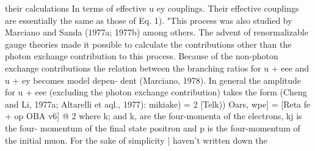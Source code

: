\documentclass[twoside]{article}
\begin{document}
{{{{{{their calculations In terms of effective u ey couplings. Their effective
couplings are essentially the same as those of Eq. 1). "This process was
also studied by Marciano and Sanda (1977a; 1977b) among others. The
advent of renormalizable gauge theories made it possible to calculate
the contributions other than the photon exchange contribution to this
process. Because of the non-photon exchange contributions the relation
between the branching ratios for u + eee and u + ey becomes model depen-
dent (Marciano, 1978). In general the amplitude for u + eee (excluding
the photon exchange contribution) takes the form (Cheng and Li, 1977a;
Altarelli et aql., 1977):
mikiake) = 2 [Telk)) Oars, wpe] =
[Reta fe + op OBA v6] @
2
where k; and k, are the four-momenta of the electrons, kj is the four-
momentum of the final state positron and p is the four-momentum of the
initial muon. For the sake of simplicity | haven't written down the


}}}}}}
\end{document}
